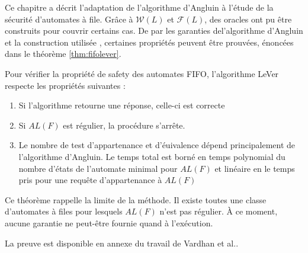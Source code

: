 Ce chapitre a décrit l'adaptation de l'algorithme d'Angluin à l'étude de la sécurité d'automates à file. Grâce à $\mathcal{W}(L)$ et $\mathcal{F}(L)$, des oracles ont pu être construits pour couvrir certains cas. De par les garanties del'algorithme d'Angluin\cite{Angluin87} et la construction utilisée \cite{Vardhan04}, certaines propriétés peuvent être prouvées, énoncées dans le théorème \ref{thm:fifolever}.

\begin{theorem}\label{thm:fifolever}
  Pour vérifier la propriété de safety des automates FIFO, l'algorithme LeVer respecte les propriétés suivantes :
  \begin{enumerate}
    \item Si l'algorithme retourne une réponse, celle-ci est correcte
    \item Si $AL(F)$ est régulier, la procédure s'arrête.
    \item Le nombre de test d'appartenance et d'éuivalence dépend principalement de l'algorithme d'Angluin. Le temps total est borné en temps polynomial du nombre d'états de l'automate minimal pour $AL(F)$ et linéaire en le temps pris pour une requête d'appartenance à $AL(F)$
  \end{enumerate}
\end{theorem}

Ce théorème rappelle la limite de la méthode. Il existe toutes une classe d'automates à files pour lesquels $AL(F)$ n'est pas régulier. À ce moment, aucune garantie ne peut-être fournie quand à l'exécution.

La preuve est disponible en annexe du travail de Vardhan et al.\cite{Vardhan04}.
